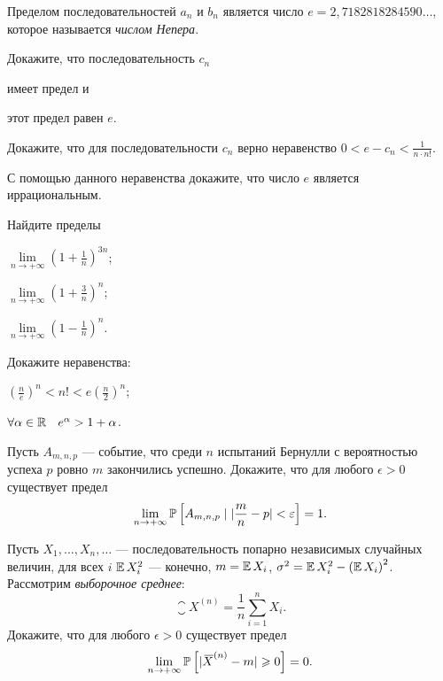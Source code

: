 \documentclass[a4paper, 12pt, num=31]{listok}
\begin{document}
\begin{definition}
    Пределом последовательностей $a_n$ и $b_n$ является число $e = 2{,}7182818284590\dots$, которое называется \textit{числом Непера}.
\end{definition}
\begin{problem}
    Докажите, что последовательность $c_n$
    \begin{probparts}
        \item имеет предел и
        \item этот предел равен $e$.
    \end{probparts}
\end{problem}
\begin{problem}[\hard]
\begin{probparts}
    \item Докажите, что для последовательности $c_n$ верно неравенство $0 < e - c_n < \frac1{n\cdot n!}$.
    \item С помощью данного неравенства докажите, что число $e$ является иррациональным.
\end{probparts}
\end{problem}
\begin{problem}
    Найдите пределы
    \begin{probparts}
        \item $\lim\limits_{n \to + \infty} {\left ( 1 + \frac 1n \right )}^{3n}$;
        \item $\lim\limits_{n \to + \infty} {\left ( 1 + \frac 3n \right )}^{n}$;
        \item $\lim\limits_{n \to + \infty} {\left ( 1 - \frac 1n \right )}^{n}$.
    \end{probparts}
\end{problem}
\begin{problem}
    Докажите неравенства:
    \begin{probparts}
        \item ${\left ( \frac n e \right )}^n < n! < e {\left ( \frac n2 \right )}^n$;
        \item $\forall{\alpha \in \R} e^\alpha > 1 + \alpha$.
    \end{probparts}
\end{problem}
\begin{problem}
    Пусть $A_{m, n, p}$ --- событие, что среди $n$ испытаний Бернулли с вероятностью успеха $p$ ровно $m$ закончились успешно.
    Докажите, что для любого $\epsilon > 0$ существует предел
    \[
        \lim_{n \to + \infty} \mathbb{P}\left [ A_{m, n, p} \mid |\frac mn - p| < \varepsilon \right ] = 1.
    \]
\end{problem}
\begin{problem}
    Пусть $X_1, \dots, X_n, \dots$ --- последовательность попарно независимых случайных величин,
    для всех $i$ $\operatorname{\mathbb{E}}{X_i^2}$ --- конечно, $m = \operatorname{\mathbb{E}}{X_i}$, $\sigma^2 = \operatorname{\mathbb{E}}{X_i^2} - {(\operatorname{\mathbb{E}}{X_i})}^2$.
    Рассмотрим \textit{выборочное среднее}:
    \[
        {\closure{X}}^{(n)} = \frac 1n \sum_{i = 1}^n X_i.
    \]
    Докажите, что для любого $\epsilon > 0$ существует предел
    \[
        \lim_{n \to +\infty} \mathbb{P}\left [ |{{}\mkern3mu\overline{\mkern-3muX}}^{(n)} - m| \geqslant 0 \right ] = 0.
    \]
\end{problem}
\end{document}
